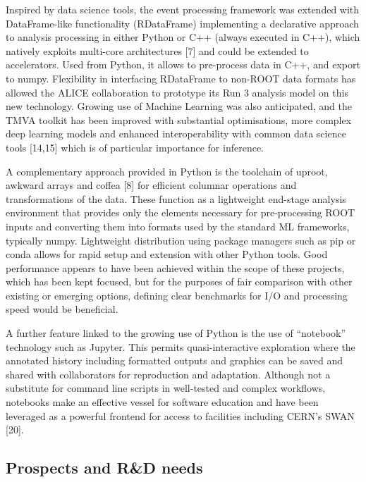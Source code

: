 \documentclass[11pt,a4paper]{article}
\begin{document}
Inspired by data science tools, the event processing framework was
extended with DataFrame-like functionality (RDataFrame) implementing a
declarative approach to analysis processing in either Python or C++
(always executed in C++), which natively exploits multi-core
architectures {[}7{]} and could be extended to accelerators. Used from
Python, it allows to pre-process data in C++, and export to numpy.
Flexibility in interfacing RDataFrame to non-ROOT data formats has
allowed the ALICE collaboration to prototype its Run 3 analysis model on
this new technology. Growing use of Machine Learning was also
anticipated, and the TMVA toolkit has been improved with substantial
optimisations, more complex deep learning models and enhanced
interoperability with common data science tools {[}14,15{]} which is of
particular importance for inference.

A complementary approach provided in Python is the toolchain of uproot,
awkward arrays and coffea {[}8{]} for efficient columnar operations and
transformations of the data. These function as a lightweight end-stage
analysis environment that provides only the elements necessary for
pre-processing ROOT inputs and converting them into formats used by the
standard ML frameworks, typically numpy. Lightweight distribution using
package managers such as pip or conda allows for rapid setup and
extension with other Python tools. Good performance appears to have been
achieved within the scope of these projects, which has been kept
focused, but for the purposes of fair comparison with other existing or
emerging options, defining clear benchmarks for I/O and processing speed
would be beneficial.

A further feature linked to the growing use of Python is the use of
``notebook'' technology such as Jupyter. This permits quasi-interactive
exploration where the annotated history including formatted outputs and
graphics can be saved and shared with collaborators for reproduction and
adaptation. Although not a substitute for command line scripts in
well-tested and complex workflows, notebooks make an effective vessel
for software education and have been leveraged as a powerful frontend
for access to facilities including CERN's SWAN {[}20{]}.

\hypertarget{prospects-and-rd-needs}{%
\subsection{Prospects and R\&D needs}\label{prospects-and-rd-needs}}
\end{document}
